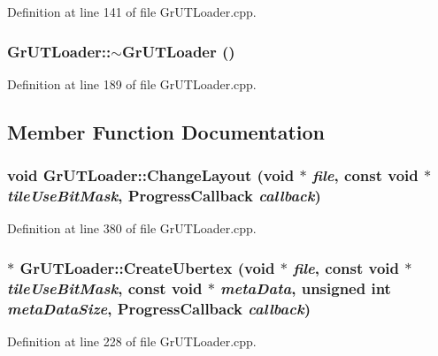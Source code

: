 \begin{CompactItemize}
Definition at line 141 of file GrUTLoader.cpp.\hypertarget{class_gr_u_t_loader_470a07f30f44b351519508c66b11ef22}{
\subsubsection[{$\sim$GrUTLoader}]{\setlength{\rightskip}{0pt plus 5cm}GrUTLoader::$\sim$GrUTLoader ()}}
\label{class_gr_u_t_loader_470a07f30f44b351519508c66b11ef22}




Definition at line 189 of file GrUTLoader.cpp.

\subsection{Member Function Documentation}
\hypertarget{class_gr_u_t_loader_291cd71cede4de0eafd22aad048f50e6}{
\subsubsection[{ChangeLayout}]{\setlength{\rightskip}{0pt plus 5cm}void GrUTLoader::ChangeLayout (void $\ast$ {\em file}, \/  const void $\ast$ {\em tileUseBitMask}, \/  {\bf ProgressCallback} {\em callback})}}
\label{class_gr_u_t_loader_291cd71cede4de0eafd22aad048f50e6}




Definition at line 380 of file GrUTLoader.cpp.\hypertarget{class_gr_u_t_loader_9a52f424b6e3bb62afbfbd05e13d048a}{
\subsubsection[{CreateUbertex}]{ $\ast$ GrUTLoader::CreateUbertex (void $\ast$ {\em file}, \/  const void $\ast$ {\em tileUseBitMask}, \/  const void $\ast$ {\em metaData}, \/  unsigned int {\em metaDataSize}, \/  {\bf ProgressCallback} {\em callback})}}
\label{class_gr_u_t_loader_9a52f424b6e3bb62afbfbd05e13d048a}




Definition at line 228 of file GrUTLoader.cpp.\hypertarget{class_gr_u_t_loader_021fb0768072b4306207993a4e8e5415}{
}
\end{CompactItemize}
